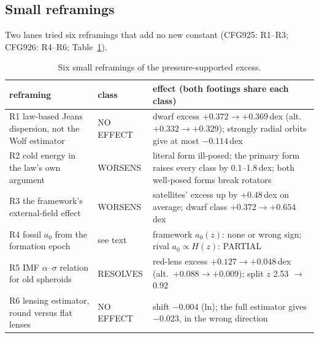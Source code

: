 \documentclass[10pt]{article}
\begin{document}
\subsection{Small reframings}
Two lanes tried six reframings that add no new constant (CFG925: R1--R3; CFG926: R4--R6; Table~\ref{tab:reframe}).
\begin{table}[b]\centering\small
\caption{Six small reframings of the pressure-supported excess.}\label{tab:reframe}
\begin{tabular}{p{}p{}p{}}
\toprule
reframing & class & effect (both footings share each class)\\
\midrule
R1 law-based Jeans dispersion, not the Wolf estimator & NO EFFECT & dwarf excess $+0.372\to+0.369$\,dex (alt.\ $+0.332\to+0.329$); strongly radial orbits give at most $-0.114$\,dex\\
R2 cold energy in the law's own argument & WORSENS & literal form ill-posed; the primary form raises every class by 0.1--1.8\,dex; both well-posed forms break rotators\\
R3 the framework's external-field effect & WORSENS & satellites' excess up by $+0.48$\,dex on average; dwarf class $+0.372\to+0.654$\,dex\\
R4 fossil $a_0$ from the formation epoch & see text & framework $a_0(z)$: none or wrong sign; rival $a_0\propto H(z)$: PARTIAL\\
R5 IMF $\alpha$--$\sigma$ relation for old spheroids & RESOLVES & red-lens excess $+0.127\to+0.048$\,dex (alt.\ $+0.088\to+0.009$); split $z$ 2.53 $\to$ 0.92\\
R6 lensing estimator, round versus flat lenses & NO EFFECT & shift $-0.004$ (ln); the full estimator gives $-0.023$, in the wrong direction\\
\bottomrule
\end{tabular}
\end{table}
\end{document}
